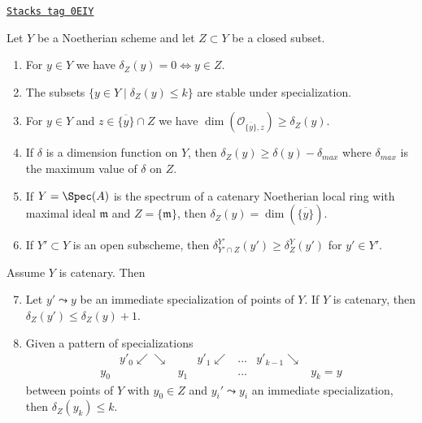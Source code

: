 \begin{lemma}[Discussion]
\label{algebraization-lemma-discussion}
\href{https://stacks.math.columbia.edu/tag/0EIY}{\texttt{Stacks tag 0EIY}}

Let $Y$ be a Noetherian scheme and let $Z \subset Y$ be a closed subset.
\begin{enumerate}
\item For $y \in Y$ we have $\delta_Z(y) = 0 \Leftrightarrow y \in Z$.
\item The subsets $\{y \in Y \mid \delta_Z(y) \leq k\}$ are
stable under specialization.
\item For $y \in Y$ and $z \in \overline{\{y\}} \cap Z$ we have
$\dim(\mathcal{O}_{\overline{\{y\}}, z}) \geq \delta_Z(y)$.
\item If $\delta$ is a dimension function on $Y$, then
$\delta_Z(y) \geq \delta(y) - \delta_{max}$ where $\delta_{max}$
is the maximum value of $\delta$ on $Z$.
\item If $Y = \Spec(A)$ is the spectrum of a catenary Noetherian local ring
with maximal ideal $\mathfrak m$ and $Z = \{\mathfrak m\}$, then
$\delta_Z(y) = \dim(\overline{\{y\}})$.
\item If $Y' \subset Y$ is an open subscheme, then
$\delta^{Y'}_{Y' \cap Z}(y') \geq \delta^Y_Z(y')$ for $y' \in Y'$.
\end{enumerate}
Assume $Y$ is catenary. Then
\begin{enumerate}
\setcounter{enumi}{6}
\item Let $y' \leadsto y$ be an immediate specialization of points of $Y$.
If $Y$ is catenary, then $\delta_Z(y') \leq \delta_Z(y) + 1$.
\item Given a pattern of specializations
$$
\begin{array}{ccccccc} & y'_0 \swarrow\searrow &  & y'_1 \swarrow & \ldots & y'_{k - 1} \searrow &  \\ y_0 &  & y_1 &  & \ldots &  & y_k = y\end{array}
$$
between points of $Y$ with $y_0 \in Z$ and $y_i' \leadsto y_i$
an immediate specialization, then $\delta_Z(y_k) \leq k$.
\end{enumerate}
\end{lemma}

